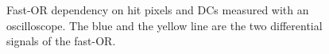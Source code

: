 \documentclass[british,11pt,a4paper]{memoir}
\begin{document}
\begin{figure}[ht]
	\hspace*{0.45cm}
	\caption{Fast-OR dependency on hit pixels and \ac{DC}s measured with an oscilloscope. The blue and the yellow line are the two differential signals of the fast-OR.}
	\label{phitcols}
\end{figure}\no
\end{document}
